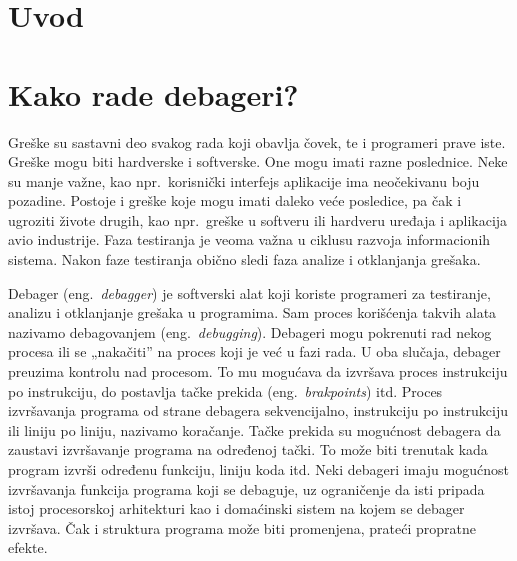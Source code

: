 \documentclass[12pt,oneside]{memoir}
\begin{document}
\frontmatter
\naslovna
\komisija
\tableofcontents*

\mainmatter

\chapter{Uvod}


\chapter{Kako rade debageri?}
\label{chp:debageri}

Greške su sastavni deo svakog rada koji obavlja čovek, te i programeri prave iste. Greške mogu biti hardverske i softverske. One mogu imati razne poslednice. Neke su manje važne, kao npr.~korisnički interfejs aplikacije ima neočekivanu boju pozadine. Postoje i greške koje mogu imati daleko veće posledice, pa čak i ugroziti živote drugih, kao npr.~greške u softveru ili hardveru uređaja i aplikacija avio industrije. Faza testiranja je veoma važna u ciklusu razvoja informacionih sistema. Nakon faze testiranja obično sledi faza analize i otklanjanja grešaka.

Debager (eng.~\emph{debagger}) je softverski alat koji koriste programeri za testiranje, analizu i otklanjanje grešaka u programima. Sam proces korišćenja takvih alata nazivamo debagovanjem (eng.~\emph{debugging}).
Debageri mogu pokrenuti rad nekog procesa ili se „nakačiti” na proces koji je već u fazi rada. U oba slučaja, debager preuzima kontrolu nad procesom. To mu mogućava da izvršava proces instrukciju po instrukciju, do postavlja tačke prekida (eng.~\emph{brakpoints}) itd. Proces izvršavanja programa od strane debagera sekvencijalno, instrukciju po instrukciju ili liniju po liniju, nazivamo koračanje. Tačke prekida su mogućnost debagera da zaustavi izvršavanje programa na određenoj tački. To može biti trenutak kada program izvrši određenu funkciju, liniju koda itd. Neki debageri imaju mogućnost izvršavanja funkcija programa koji se debaguje, uz ograničenje da isti pripada istoj procesorskoj arhitekturi kao i domaćinski sistem na kojem se debager izvršava. Čak i struktura programa može biti promenjena, prateći propratne efekte.
\end{document}
